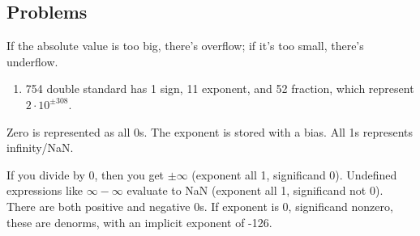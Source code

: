 \subsection{Problems}
If the absolute value is too big, there's overflow; if it's too small, there's underflow.
\begin{enumerate}
	\item 754 double standard has 1 sign, 11 exponent, and 52 fraction, which represent \(2\cdot10^{\pm308}\).
\end{enumerate}

Zero is represented as all 0s. The exponent is stored with a bias. All 1s represents infinity/NaN.

If you divide by 0, then you get \(\pm \infty\) (exponent all 1, significand 0). Undefined expressions like \(\infty - \infty\) evaluate to NaN (exponent all 1, significand not 0). There are both positive and negative 0s.
If exponent is 0, significand nonzero, these are denorms, with an implicit exponent of -126.

